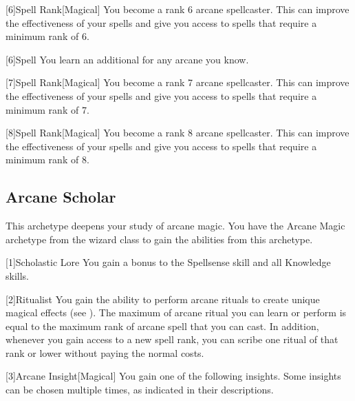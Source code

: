         [6]{Spell Rank}[Magical] You become a rank 6 arcane spellcaster.
        This can improve the effectiveness of your spells and give you access to spells that require a minimum rank of 6.

        [6]{Spell} You learn an additional  for any arcane  you know.

        [7]{Spell Rank}[Magical] You become a rank 7 arcane spellcaster.
        This can improve the effectiveness of your spells and give you access to spells that require a minimum rank of 7.

        [8]{Spell Rank}[Magical] You become a rank 8 arcane spellcaster.
        This can improve the effectiveness of your spells and give you access to spells that require a minimum rank of 8.

    \subsection{Arcane Scholar}
        This archetype deepens your study of arcane magic.
        You have the Arcane Magic archetype from the wizard class to gain the abilities from this archetype.

        [1]{Scholastic Lore} You gain a  bonus to the Spellsense skill and all Knowledge skills.

        [2]{Ritualist} You gain the ability to perform arcane rituals to create unique magical effects (see ).
        The maximum  of arcane ritual you can learn or perform is equal to the maximum rank of arcane spell that you can cast.
        In addition, whenever you gain access to a new spell rank, you can scribe one ritual of that rank or lower without paying the normal costs.

        [3]{Arcane Insight}[Magical]
        You gain one of the following insights.
        Some insights can be chosen multiple times, as indicated in their descriptions.

